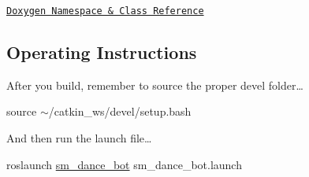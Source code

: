 \href{https://reelrbtx.github.io/SMACC/master/html/namespacesm__dance__bot.html}{\tt Doxygen Namespace \& Class Reference}

\subsection*{Operating Instructions}

After you build, remember to source the proper devel folder…

source $\sim$/catkin\+\_\+ws/devel/setup.bash

And then run the launch file…

roslaunch \hyperlink{namespacesm__dance__bot}{sm\+\_\+dance\+\_\+bot} sm\+\_\+dance\+\_\+bot.\+launch 